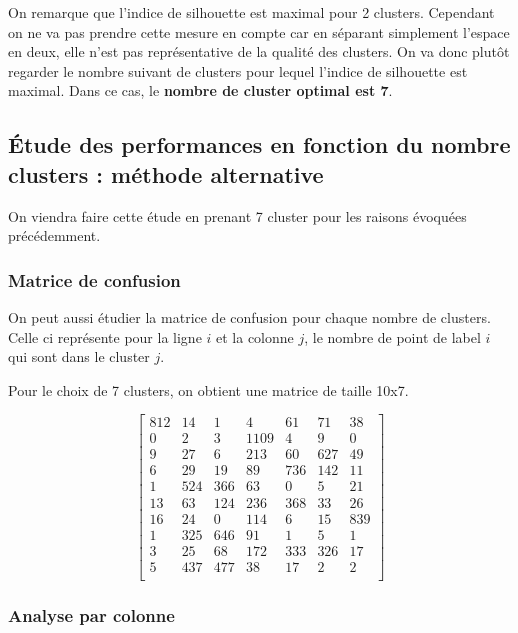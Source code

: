 \documentclass[french,a4paper,18pt]{article}
\begin{document}
On remarque que l'indice de silhouette est maximal pour 2 clusters. 
Cependant on ne va pas prendre cette mesure en compte car en séparant simplement l'espace en deux, 
elle n'est pas représentative de la qualité des clusters. 
On va donc plutôt regarder le nombre suivant de clusters pour lequel l'indice de silhouette est maximal. 
Dans ce cas, le \textbf{nombre de cluster optimal est 7}.

\subsection{Étude des performances en fonction du nombre clusters : méthode alternative}

On viendra faire cette étude en prenant 7 cluster pour les raisons évoquées précédemment.

\subsubsection{Matrice de confusion} 
On peut aussi étudier la matrice de confusion pour chaque nombre de clusters.
Celle ci représente pour la ligne $i$ et la colonne $j$, le nombre de point de label $i$ qui sont dans le cluster $j$.

Pour le choix de 7 clusters, on obtient une matrice de taille 10x7.

\[
\begin{bmatrix}
    812 & 14 & 1 & 4 & 61 & 71 & 38 \\
    0 & 2 & 3 & 1109 & 4 & 9 & 0 \\
    9 & 27 & 6 & 213 & 60 & 627 & 49 \\
    6 & 29 & 19 & 89 & 736 & 142 & 11 \\
    1 & 524 & 366 & 63 & 0 & 5 & 21 \\
    13 & 63 & 124 & 236 & 368 & 33 & 26 \\
    16 & 24 & 0 & 114 & 6 & 15 & 839 \\
    1 & 325 & 646 & 91 & 1 & 5 & 1 \\
    3 & 25 & 68 & 172 & 333 & 326 & 17 \\
    5 & 437 & 477 & 38 & 17 & 2 & 2 \\
    \end{bmatrix}
\]    


\subsubsection{Analyse par colonne} 
\end{document}
